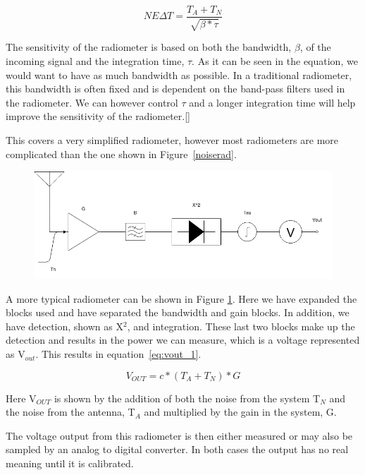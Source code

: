 \begin{equation} \label{NEAT_EQ}
NE\Delta T=\frac{T_{A}+T_{N}}{\sqrt{\beta * \tau}}
\end{equation}

The sensitivity of the radiometer is based on both the bandwidth, $\beta$, of the incoming signal and the integration time, $\tau$.  As it can be seen in the equation, we would want to have as much bandwidth as possible.  In a traditional radiometer, this bandwidth is often fixed and is dependent on the band-pass filters used in the radiometer.  We can however control $\tau$ and a longer integration time will help improve the sensitivity of the radiometer.[\cite{skou}]

This covers a very simplified radiometer, however most radiometers are more complicated than the one shown in Figure~\ref{noiserad}.

{\begin{figure}[h!tb] 
\centering
\includegraphics[width=\textwidth]{Images/Radiometer.png}
\label{trad_radiometer}
\end{figure}
}

A more typical radiometer can be shown in Figure \ref{trad_radiometer}.  Here we have expanded the blocks used and have separated the bandwidth and gain blocks.  In addition, we have detection, shown as X$^2$, and integration.  These last two blocks make up the detection and results in the power we can measure, which is a voltage represented as V$_{out}$.  This results in equation~\ref{eq:vout_1}.

\begin{equation} \label{eq:vout_1}
V_{OUT}=c*(T_A+T_N)*G
\end{equation}

Here V$_{OUT}$ is shown by the addition of both the noise from the system T$_N$ and the noise from the antenna, T$_A$ and multiplied by the gain in the system, G.

The voltage output from this radiometer is then either measured or may also be sampled by an analog to digital converter.  In both cases the output has no real meaning until it is calibrated.

